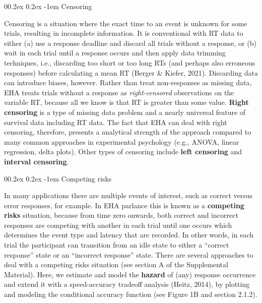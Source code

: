 \documentclass[
  english,
  man, donotrepeattitle,floatsintext]{apa6}
\makeatletter
\let\oldparagraph\paragraph
\renewcommand{\paragraph}{
    \@ifstar
      \xxxParagraphStar
      \xxxParagraphNoStar
  }
\newcommand{\xxxParagraphStar}[1]{\oldparagraph*{#1}\mbox{}}
\newcommand{\xxxParagraphNoStar}[1]{\oldparagraph{#1}\mbox{}}
\renewcommand{\paragraph}{\@startsection{paragraph}{4}{\parindent}%
  {0\baselineskip \@plus 0.2ex \@minus 0.2ex}%
  {-1em}%
  {\normalfont\normalsize\bfseries\itshape\typesectitle}}
\makeatother
\begin{document}
\paragraph{Censoring}\label{censoring}

Censoring is a situation where the exact time to an event is unknown for some trials, resulting in incomplete information. It is conventional with RT data to either (a) use a response deadline and discard all trials without a response, or (b) wait in each trial until a response occurs and then apply data trimming techniques, i.e., discarding too short or too long RTs (and perhaps also erroneous responses) before calculating a mean RT (Berger \& Kiefer, 2021). Discarding data can introduce biases, however.
Rather than treat non-responses as missing data, EHA treats trials without a response as \emph{right-censored} observations on the variable RT, because all we know is that RT is greater than some value. \textbf{Right censoring} is a type of missing data problem and a nearly universal feature of survival data including RT data.
The fact that EHA can deal with right censoring, therefore, presents a analytical strength of the approach compared to many common approaches in experimental psychology (e.g., ANOVA, linear regression, delta plots). Other types of censoring include \textbf{left censoring} and \textbf{interval censoring}.

\paragraph{Competing risks}\label{competing-risks}

In many applications there are multiple events of interest, such as correct versus error responses, for example. In EHA parlance this is known as a \textbf{competing risks} situation, because from time zero onwards, both correct and incorrect responses are competing with another in each trial until one occurs which determines the event type and latency that are recorded. In other words, in each trial the participant can transition from an idle state to either a ``correct response'' state or an ``incorrect response'' state.
There are several approaches to deal with a competing risks situation (see section A of the Supplemental Material). Here, we estimate and model the \textbf{hazard} of (any) response occurrence and extend it with a speed-accuracy tradeoff analysis (Heitz, 2014), by plotting and modeling the conditional accuracy function (see Figure 1B and section 2.1.2).
\end{document}
